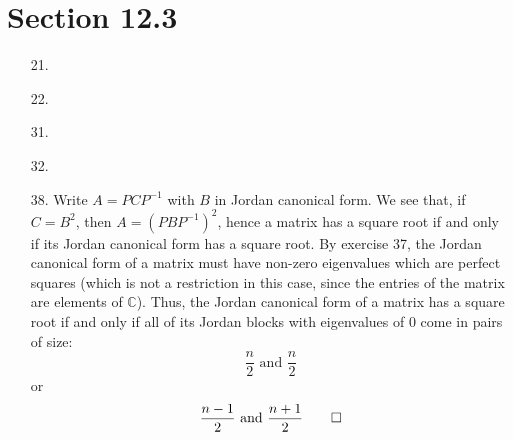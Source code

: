 \documentclass[12pt,leqno]{book}
\theoremstyle{definition}
\newcommand{\C}{\mathbb{C}}
\begin{document}
\section*{Section 12.3}
\begin{enumerate}
 \item [21.]
 \item [22.]
 \item [31.]
 \item [32.]
 \item [38.] Write $A=PCP^{-1}$ with $B$ in Jordan canonical form. We see that, if $C=B^2$, then $A=(PBP^{-1})^2$, hence a matrix has a square root if and only if its Jordan canonical form has a square root. By exercise 37, the Jordan canonical form of a matrix must have non-zero eigenvalues which are perfect squares (which is not a restriction in this case, since the entries of the matrix are elements of $\C$). Thus, the Jordan canonical form of a matrix has a square root if and only if all of its Jordan blocks with eigenvalues of 0 come in pairs of size: \[\frac{n}{2}\text{ and }\frac{n}{2}\] or \[\frac{n-1}{2}\text{ and }\frac{n+1}{2}\qedhere\]
\end{enumerate}
\end{document}
